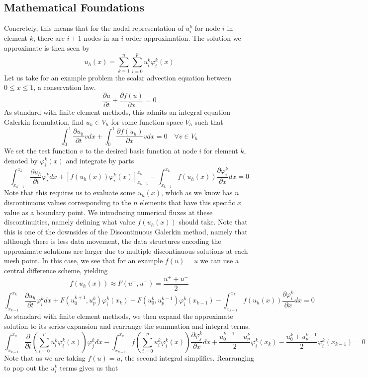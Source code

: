 \documentclass[openany]{book}
\newcommand{\p}[2]{\frac{\partial#1}{\partial#2}}
\begin{document}
\subsection{Mathematical Foundations}
Concretely, this means that for the nodal representation of $u_i^k$ for node $i$ in element $k$, there are $i+1$ nodes in an $i$-order approximation. The solution we approximate is then seen by
$$u_h(x) = \sum^n_{k=1}\sum^p_{i=0}u_i^k\varphi^k_i(x)$$
Let us take for an example problem the scalar advection equation between $0\leq x\leq 1$, a conservation law. 
$$ \p{u}{t} + \p{f(u)}{x} = 0 $$
As standard with finite element methods, this admits an integral equation Galerkin formulation, find $u_h \in V_h$ for some function space $V_h$ such that
$$ \int^1_0 \p{u_h}{t}vdx + \int^1_0 \p{f(u_h)}{x} v dx = 0 \quad \forall v \in V_h$$
We set the test function $v$ to the desired basis function at node $i$ for element $k$, denoted by $\varphi_i^k(x)$ and integrate by parts
$$ \int_{x_{k-1}}^{x_k} \p{u_h}{t} \varphi^k_i dx + \left[ f(u_h(x))\varphi_i^k(x)\right]^{x_k}_{x_{k-1}} - \int_{x_{k-1}}^{x_k} f(u_h(x)) \p{\varphi_i^k}{x}dx = 0$$
Note that this requires us to evaluate some $u_h(x)$, which as we know has $n$ discontinuous values corresponding to the $n$ elements that have this specific $x$ value as a boundary point. We introducing numerical fluxes at these discontinuities, namely defining what value $f(u_h(x))$ should take. Note that this is one of the downsides of the Discontinuous Galerkin method, namely that although there is less data movement, the data structures encoding the approximate solutions are larger due to multiple discontinuous solutions at each mesh point. In this case, we see that for an example $f(u) = u$ we can use a central difference scheme, yielding 
$$f(u_h(x))\approx F(u^+, u^-) = \frac{u^+ + u^-}{2}$$
$$\int_{x_{k-1}}^{x_k} \p{u_h}{t} \varphi^k_i dx + F(u_0^{k+1},u_p^k)\varphi^k_i(x_k) - F(u_0^k,u_p^{k-1})\varphi_i^k(x_{k-1}) - \int_{x_{k-1}}^{x_k} f(u_h(x)) \p{\varphi_i^k}{x}dx = 0$$
As standard with finite element methods, we then expand the approximate solution to its series expansion and rearrange the summation and integral terms.
\begin{dmath*}
\int_{x_{k-1}}^{x_k} \p{}{t}\left(\sum^p_{i=0}u_i^k\varphi^k_i(x) \right)\varphi^k_j dx - \int_{x_{k-1}}^{x_k} f\left(\sum^p_{i=0}u_i^k\varphi^k_i(x) \right) \p{\varphi_j^k}{x}dx  + \frac{u_0^{k+1} + u_p^k}{2}\varphi^k_i(x_k) - \frac{u_0^k + u_p^{k-1}}{2}\varphi_i^k(x_{k-1})= 0
\end{dmath*}
Note that as we are taking $f(u)=u$, the second integral simplifies. Rearranging to pop out the $u_i^k$ terms gives us that
\end{document}
